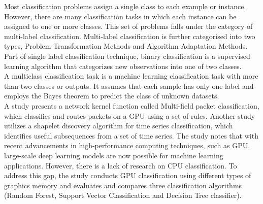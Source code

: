 	Most classification problems assign a single class to each example or instance\cite{b1}. However, there are many classification tasks in which each instance can be assigned to one or more classes. This set of problems falls under the category of multi-label classification\cite{C10}. Multi-label classification is further categorised into two types, Problem Transformation Methods and  Algorithm Adaptation Methods.\\ 
	
	Part of single label classification technique, binary classification is a supervised learning algorithm that categorizes new observations into one of two classes\cite{C13}. \\
	A multiclass classification task is a machine learning classification task with more than two classes or outputs\cite{C14}. It assumes that each sample has only one label and employs the Bayes theorem to predict the class of unknown datasets\cite{C14}.\\	
	
	A study presents a network kernel function called Multi-field packet classification, which classifies and routes packets on a GPU using a set of rules\cite{C15}. Another study utilizes a shapelet discovery algorithm for time series classification, which identifies useful subsequences from a set of time series\cite{C16}. The study notes that with recent advancements in high-performance computing techniques, such as GPU, large-scale deep learning models are now possible for machine learning applications\cite{C17}. However, there is a lack of research on CPU classification. To address this gap, the study conducts GPU classification using different types of graphics memory and evaluates and compares three classification algorithms (Random Forest, Support Vector Classification and Decision Tree classifier).
